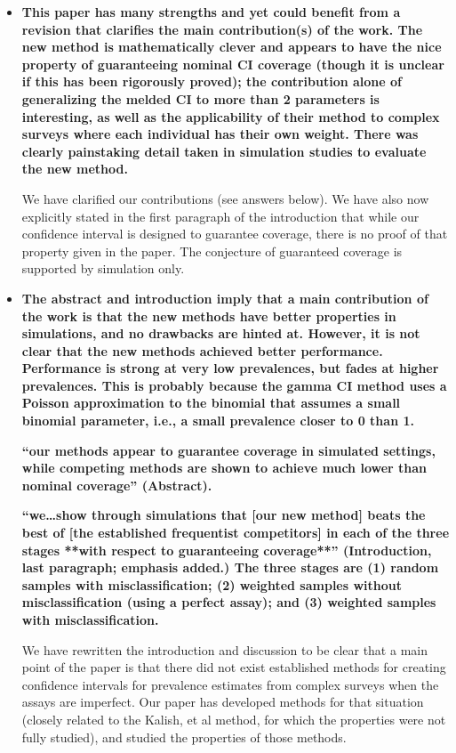 \documentclass[11pt]{article}
\begin{document}
\begin{itemize}
    \item \textbf{This paper has many strengths and yet could benefit from a revision that clarifies the main contribution(s) of the work. The new method is mathematically clever and appears to have the nice property of guaranteeing nominal CI coverage (though it is unclear if this has been rigorously proved); the contribution alone of generalizing the melded CI to more than 2 parameters is interesting, as well as the applicability of their method to complex surveys where each individual has their own weight. There was clearly painstaking detail taken in simulation studies to evaluate the new method.}

We have clarified our contributions (see answers below). 
We have also now explicitly stated in the first paragraph of the introduction that while our confidence interval is designed to guarantee coverage, there is no proof of that property given in the paper.
The conjecture of guaranteed coverage is supported by simulation only.

    \item \textbf{The abstract and introduction imply that a main contribution of the work is that the new methods have better properties in simulations, and no drawbacks are hinted at. However, it is not clear that the new methods achieved better performance. Performance is strong at very low prevalences, but fades at higher prevalences. This is probably because the gamma CI method uses a Poisson approximation to the binomial that assumes a small binomial parameter, i.e., a small prevalence closer to 0 than 1.}

    \textbf{“our methods appear to guarantee coverage in simulated settings, while competing methods are shown to achieve much lower than nominal coverage” (Abstract).}

    \textbf{“we…show through simulations that [our new method] beats the best of [the established frequentist competitors] in each of the three stages **with respect to guaranteeing coverage**” (Introduction, last paragraph; emphasis added.) The three stages are (1) random samples with misclassification; (2) weighted samples without misclassification (using a perfect assay); and (3) weighted samples with misclassification.}

We have rewritten the introduction and discussion to be clear
that a main point of the paper is that there did not exist 
established methods for creating confidence intervals for prevalence estimates from complex surveys when the assays are imperfect.
Our paper has developed methods for that situation
(closely related to the Kalish, et al method, for which the properties were not fully studied), and studied the properties  of those methods. 


\end{itemize}
\end{document}
